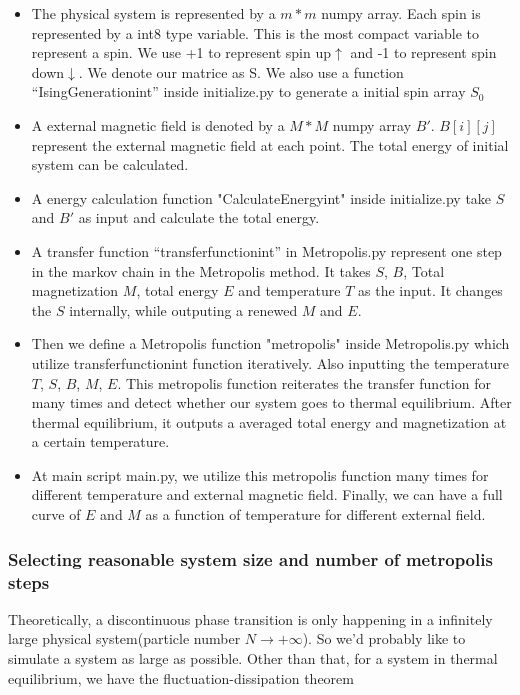 \documentclass[11pt]{article}
\begin{document}
\begin{itemize}
    \item The physical system is represented by a $m*m$ numpy array. Each spin is represented by a int8 type variable. This is the most compact variable to represent a spin. We use +1 to represent spin up$\uparrow$ and -1 to represent spin down$\downarrow$. We denote our matrice as S. We also use a function “IsingGenerationint” inside initialize.py to generate a initial spin array $S_0$
    \item A external magnetic field is denoted by a $M*M$ numpy array $B'$. $B[i][j]$ represent the external magnetic field at each point. The total energy of initial system can be calculated.
    \item A energy calculation function "CalculateEnergyint" inside initialize.py take $S$ and $B'$ as input and calculate the total energy.
    \item A transfer function “transferfunctionint” in Metropolis.py represent one step in the markov chain in the Metropolis method. It takes $S$, $B$, Total magnetization $M$, total energy $E$ and temperature $T$ as the input. It changes the $S$ internally, while outputing a renewed $M$ and $E$.
    \item Then we define a Metropolis function "metropolis" inside Metropolis.py which utilize transferfunctionint function iteratively. Also inputting the temperature $T$, $S$, $B$, $M$, $E$. This metropolis function reiterates the transfer function for many times and detect whether our system goes to thermal equilibrium. After thermal equilibrium, it outputs a averaged total energy and magnetization at a certain temperature.
    \item At main script main.py, we utilize this metropolis function many times for different temperature and external magnetic field. Finally, we can have a full curve of $E$ and $M$ as a function of temperature for different external field.
\end{itemize}

\subsubsection{Selecting reasonable system size and number of metropolis steps}

Theoretically, a discontinuous phase transition is only happening in a infinitely large physical system(particle number $N \rightarrow +\infty$). So we'd probably like to simulate a system as large as possible. Other than that, for a system in thermal equilibrium, we have the fluctuation-dissipation theorem
\end{document}

